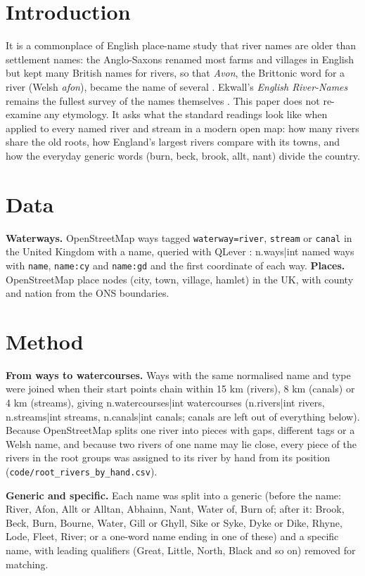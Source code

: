 \documentclass[11pt,a4paper]{article}
\begin{document}
\section{Introduction}
It is a commonplace of English place-name study that river names are older than settlement names: the Anglo-Saxons renamed most farms and villages in English but kept many British names for rivers, so that \textit{Avon}, the Brittonic word for a river (Welsh \textit{afon}), became the name of several \citep{ekwall1928,gelling2000,mills2011}. Ekwall's \textit{English River-Names} remains the fullest survey of the names themselves \citep{ekwall1928}. This paper does not re-examine any etymology. It asks what the standard readings look like when applied to every named river and stream in a modern open map: how many rivers share the old roots, how England's largest rivers compare with its towns, and how the everyday generic words (burn, beck, brook, allt, nant) divide the country.

\section{Data}
\textbf{Waterways.} OpenStreetMap ways tagged \texttt{waterway=river}, \texttt{stream} or \texttt{canal} in the United Kingdom with a name, queried with QLever \citep{bast2017}: {{n.ways|int}} named ways with \texttt{name}, \texttt{name:cy} and \texttt{name:gd} and the first coordinate of each way. \textbf{Places.} OpenStreetMap place nodes (city, town, village, hamlet) in the UK, with county and nation from the ONS boundaries.

\section{Method}
\textbf{From ways to watercourses.} Ways with the same normalised name and type were joined when their start points chain within 15 km (rivers), 8 km (canals) or 4 km (streams), giving {{n.watercourses|int}} watercourses ({{n.rivers|int}} rivers, {{n.streams|int}} streams, {{n.canals|int}} canals; canals are left out of everything below). Because OpenStreetMap splits one river into pieces with gaps, different tags or a Welsh name, and because two rivers of one name may lie close, every piece of the rivers in the root groups was assigned to its river by hand from its position (\texttt{code/root\_rivers\_by\_hand.csv}).

\textbf{Generic and specific.} Each name was split into a generic (before the name: River, Afon, Allt or Alltan, Abhainn, Nant, Water of, Burn of; after it: Brook, Beck, Burn, Bourne, Water, Gill or Ghyll, Sike or Syke, Dyke or Dike, Rhyne, Lode, Fleet, River; or a one-word name ending in one of these) and a specific name, with leading qualifiers (Great, Little, North, Black and so on) removed for matching.
\end{document}
